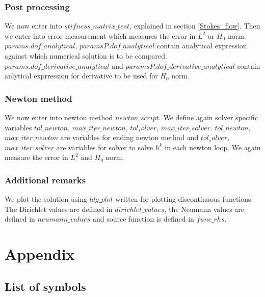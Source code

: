 \documentclass[a4paper,12pt]{book}
\begin{document}
\subsection{Post processing}

We now enter into $stifness\_matrix\_test$, explained in section \ref{Stokes_flow}. Then we enter into error measurement which measures the error in $L^2$ or $H_0$ norm. $params.dof\_analytical$, $paramsP.dof\_analytical$ contain analytical expression against which numerical solution is to be compared. $params.dof\_derivative\_analytical$ and  $paramsP.dof\_derivative\_analytical$ contain anlytical exprression for derivative to be used for $H_0$ norm.\\

\subsection{Newton method}

We now enter into newton method $newton\_script$. We define again solver specific variables $tol\_newton$, $max\_iter\_newton$, $tol_solver$, $max\_iter\_solver$. $tol\_newton$, $max\_iter\_newton$ are variables for ending newton method and $tol_solver$, $max\_iter\_solver$ are variables for solver to solve $h^k$ in each newton loop. We again measure the error in $L^2$ and $H_0$ norm.\\

\subsection{Additional remarks}

We plot the solution using  $ldg\_plot$ written for plotting discontinuous functions. The Dirichlet values are defined in $dirichlet\_values$, the Neumann values are defined in $neumann\_values$ and source function is defined in $func\_rhs$. 

\chapter{Appendix}

\section{List of symbols} \label{symbol_list}
\end{document}
